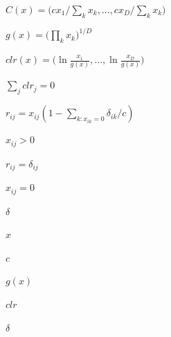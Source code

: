
$C(x)=\big(c x_1/\sum_k x_k,\dots,c x_D/\sum_k x_k\big)$

$g(x)=\big(\prod_k x_k\big)^{1/D}$

$clr(x)=\big(\ln\frac{x_1}{g(x)},\dots,\ln\frac{x_D}{g(x)}\big)$

$\sum_j clr_j=0$

$r_{ij}=x_{ij}(1-\sum_{k:x_{ik}=0}\delta_{ik}/c)$

$x_{ij}>0$

$r_{ij}=\delta_{ij}$

$x_{ij}=0$

$\delta$

$x$

$c$

$g(x)$

$clr$

$\delta$
